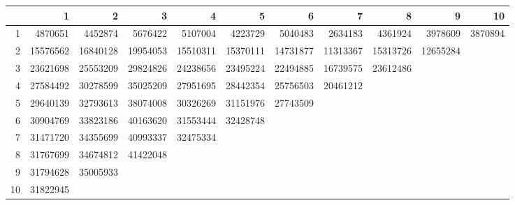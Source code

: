 \documentclass[a4paper]{article}
\begin{document}
\begin{table}[ht]
\centering
\begin{tabular}{rrrrrrrrrrr}
  \hline
 & 1 & 2 & 3 & 4 & 5 & 6 & 7 & 8 & 9 & 10 \\ 
  \hline
1 & 4870651 & 4452874 & 5676422 & 5107004 & 4223729 & 5040483 & 2634183 & 4361924 & 3978609 & 3870894 \\ 
  2 & 15576562 & 16840128 & 19954053 & 15510311 & 15370111 & 14731877 & 11313367 & 15313726 & 12655284 &  \\ 
  3 & 23621698 & 25553209 & 29824826 & 24238656 & 23495224 & 22494885 & 16739575 & 23612486 &  &  \\ 
  4 & 27584492 & 30278599 & 35025209 & 27951695 & 28442354 & 25756503 & 20461212 &  &  &  \\ 
  5 & 29640139 & 32793613 & 38074008 & 30326269 & 31151976 & 27743509 &  &  &  &  \\ 
  6 & 30904769 & 33823186 & 40163620 & 31553444 & 32428748 &  &  &  &  &  \\ 
  7 & 31471720 & 34355699 & 40993337 & 32475334 &  &  &  &  &  &  \\ 
  8 & 31767699 & 34674812 & 41422048 &  &  &  &  &  &  &  \\ 
  9 & 31794628 & 35005933 &  &  &  &  &  &  &  &  \\ 
  10 & 31822945 &  &  &  &  &  &  &  &  &  \\ 
   \hline
\end{tabular}
\end{table}

\end{document}
